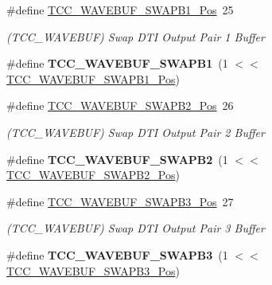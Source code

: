 \begin{DoxyCompactItemize}
\item 
\hypertarget{group___s_a_m_l21___t_c_c_ga67e966b64d0d29a668c371a720f54fc6}{}\#define \hyperlink{group___s_a_m_l21___t_c_c_ga67e966b64d0d29a668c371a720f54fc6}{T\+C\+C\+\_\+\+W\+A\+V\+E\+B\+U\+F\+\_\+\+S\+W\+A\+P\+B1\+\_\+\+Pos}~25\label{group___s_a_m_l21___t_c_c_ga67e966b64d0d29a668c371a720f54fc6}

\begin{DoxyCompactList}\small\item\em (T\+C\+C\+\_\+\+W\+A\+V\+E\+B\+U\+F) Swap D\+T\+I Output Pair 1 Buffer \end{DoxyCompactList}\item 
\hypertarget{group___s_a_m_l21___t_c_c_ga4095301789ebe6ee966f5b0a4fa48690}{}\#define {\bfseries T\+C\+C\+\_\+\+W\+A\+V\+E\+B\+U\+F\+\_\+\+S\+W\+A\+P\+B1}~(1 $<$$<$ \hyperlink{group___s_a_m_l21___t_c_c_ga67e966b64d0d29a668c371a720f54fc6}{T\+C\+C\+\_\+\+W\+A\+V\+E\+B\+U\+F\+\_\+\+S\+W\+A\+P\+B1\+\_\+\+Pos})\label{group___s_a_m_l21___t_c_c_ga4095301789ebe6ee966f5b0a4fa48690}

\item 
\hypertarget{group___s_a_m_l21___t_c_c_gaa3f385f093d90fbf9937b59e379dab66}{}\#define \hyperlink{group___s_a_m_l21___t_c_c_gaa3f385f093d90fbf9937b59e379dab66}{T\+C\+C\+\_\+\+W\+A\+V\+E\+B\+U\+F\+\_\+\+S\+W\+A\+P\+B2\+\_\+\+Pos}~26\label{group___s_a_m_l21___t_c_c_gaa3f385f093d90fbf9937b59e379dab66}

\begin{DoxyCompactList}\small\item\em (T\+C\+C\+\_\+\+W\+A\+V\+E\+B\+U\+F) Swap D\+T\+I Output Pair 2 Buffer \end{DoxyCompactList}\item 
\hypertarget{group___s_a_m_l21___t_c_c_gaea55c5ab207ef3ae84315cc57342913d}{}\#define {\bfseries T\+C\+C\+\_\+\+W\+A\+V\+E\+B\+U\+F\+\_\+\+S\+W\+A\+P\+B2}~(1 $<$$<$ \hyperlink{group___s_a_m_l21___t_c_c_gaa3f385f093d90fbf9937b59e379dab66}{T\+C\+C\+\_\+\+W\+A\+V\+E\+B\+U\+F\+\_\+\+S\+W\+A\+P\+B2\+\_\+\+Pos})\label{group___s_a_m_l21___t_c_c_gaea55c5ab207ef3ae84315cc57342913d}

\item 
\hypertarget{group___s_a_m_l21___t_c_c_ga49c4e02e99af8ae3d86f1a1c0367d9bf}{}\#define \hyperlink{group___s_a_m_l21___t_c_c_ga49c4e02e99af8ae3d86f1a1c0367d9bf}{T\+C\+C\+\_\+\+W\+A\+V\+E\+B\+U\+F\+\_\+\+S\+W\+A\+P\+B3\+\_\+\+Pos}~27\label{group___s_a_m_l21___t_c_c_ga49c4e02e99af8ae3d86f1a1c0367d9bf}

\begin{DoxyCompactList}\small\item\em (T\+C\+C\+\_\+\+W\+A\+V\+E\+B\+U\+F) Swap D\+T\+I Output Pair 3 Buffer \end{DoxyCompactList}\item 
\hypertarget{group___s_a_m_l21___t_c_c_ga912eb5aa7fde3f50e7a1874b819bc64d}{}\#define {\bfseries T\+C\+C\+\_\+\+W\+A\+V\+E\+B\+U\+F\+\_\+\+S\+W\+A\+P\+B3}~(1 $<$$<$ \hyperlink{group___s_a_m_l21___t_c_c_ga49c4e02e99af8ae3d86f1a1c0367d9bf}{T\+C\+C\+\_\+\+W\+A\+V\+E\+B\+U\+F\+\_\+\+S\+W\+A\+P\+B3\+\_\+\+Pos})\label{group___s_a_m_l21___t_c_c_ga912eb5aa7fde3f50e7a1874b819bc64d}


\end{DoxyCompactItemize}
